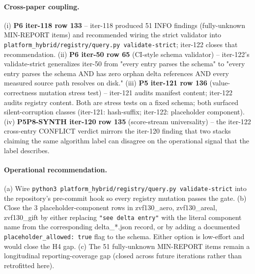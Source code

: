 \paragraph{Cross-paper coupling.}
(i) \textbf{P6 iter-118 row 133} -- iter-118 produced 51 INFO findings
(fully-unknown MIN-REPORT items) and recommended wiring the strict
validator into \texttt{platform_hybrid/registry/query.py validate-strict}; iter-122
closes that recommendation. (ii) \textbf{P6 iter-50 row 65} (CI-style
schema validator) -- iter-122's validate-strict generalizes iter-50
from "every entry parses the schema" to "every entry parses the schema
AND has zero orphan delta references AND every measured source path
resolves on disk." (iii) \textbf{P5 iter-121 row 136} (value-correctness
mutation stress test) -- iter-121 audits manifest content; iter-122
audits registry content. Both are stress tests on a fixed schema; both
surfaced silent-corruption classes (iter-121: hash-suffix; iter-122:
placeholder component). (iv) \textbf{P5P8-SYNTH iter-120 row 135}
(score-stream universality) -- the iter-122 cross-entry CONFLICT
verdict mirrors the iter-120 finding that two stacks claiming the same
algorithm label can disagree on the operational signal that the label
describes.

\paragraph{Operational recommendation.}
(a) Wire \texttt{python3 platform_hybrid/registry/query.py validate-strict} into the
repository's pre-commit hook so every registry mutation passes the gate.
(b) Close the 3 placeholder-component rows in zvf130\_aero, zvf130\_areal,
zvf130\_gift by either replacing \texttt{"see delta entry"} with the
literal component name from the corresponding delta\_*.json record, or
by adding a documented \texttt{placeholder\_allowed: true} flag to the
schema. Either option is low-effort and would close the H4 gap. (c)
The 51 fully-unknown MIN-REPORT items remain a longitudinal
reporting-coverage gap (closed across future iterations rather than
retrofitted here).